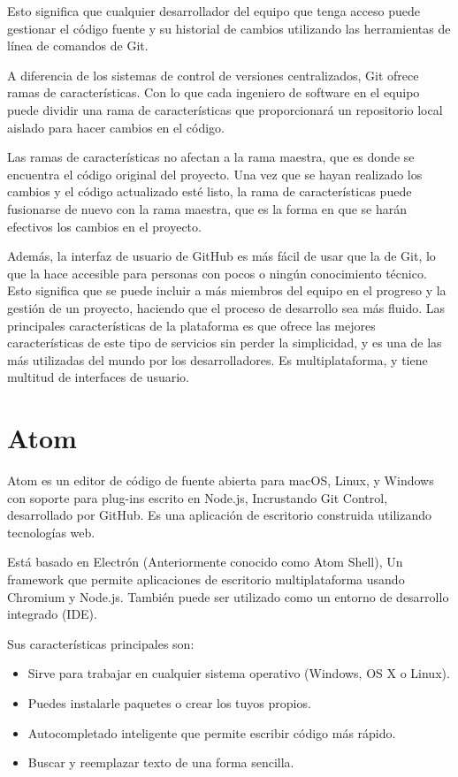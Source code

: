 \documentclass[a4paper, 12pt]{book}
\begin{document}
Esto significa que cualquier desarrollador del equipo que tenga acceso puede gestionar el código fuente y su historial de cambios utilizando las herramientas de línea de comandos de Git.

A diferencia de los sistemas de control de versiones centralizados, Git ofrece ramas de características. Con lo que cada ingeniero de software en el equipo puede dividir una rama de características que proporcionará un repositorio local aislado para hacer cambios en el código.

Las ramas de características no afectan a la rama maestra, que es donde se encuentra el código original del proyecto. Una vez que se hayan realizado los cambios y el código actualizado esté listo, la rama de características puede fusionarse de nuevo con la rama maestra, que es la forma en que se harán efectivos los cambios en el proyecto.

Además, la interfaz de usuario de GitHub es más fácil de usar que la de Git, lo que la hace accesible para personas con pocos o ningún conocimiento técnico. Esto significa que se puede incluir a más miembros del equipo en el progreso y la gestión de un proyecto, haciendo que el proceso de desarrollo sea más fluido.
Las principales características de la plataforma es que ofrece las mejores características de este tipo de servicios sin perder la simplicidad, y es una de las más utilizadas del mundo por los desarrolladores. Es multiplataforma, y tiene multitud de interfaces de usuario.


\newpage
\section{Atom} 
\label{sec:Atom}

Atom es un editor de código de fuente abierta para macOS, Linux, y Windows con soporte para plug-ins escrito en Node.js, Incrustando Git Control, desarrollado por GitHub. Es una aplicación de escritorio construida utilizando tecnologías web.

Está basado en Electrón (Anteriormente conocido como Atom Shell), Un framework que permite aplicaciones de escritorio multiplataforma usando Chromium y Node.js. También puede ser utilizado como un entorno de desarrollo integrado (IDE).

Sus características principales son:
\begin{itemize}
    \item Sirve para trabajar en cualquier sistema operativo (Windows, OS X o Linux).
    \item Puedes instalarle paquetes o crear los tuyos propios.
    \item Autocompletado inteligente que permite escribir código más rápido.
    \item Buscar y reemplazar texto de una forma sencilla.
\end{itemize}
\end{document}
